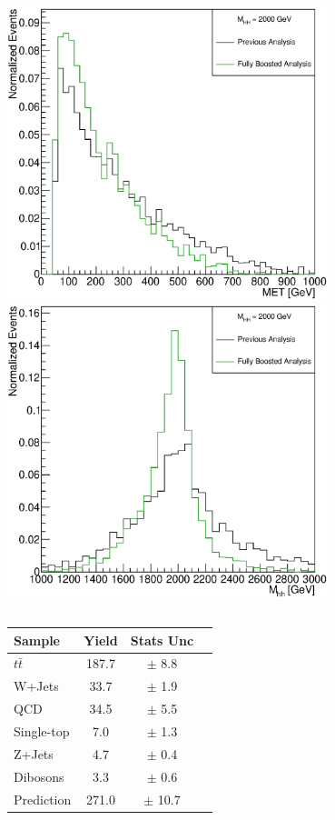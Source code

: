 \documentclass{beamer}
\newcommand*{\ttbar}{\ensuremath{t\bar{t}}\xspace}
\newcommand*{\header}[1]{\fontsize{16}{8}\selectfont \textbf{{\color{MyPurple}{#1}}}}
\begin{document}
\begin{frame}
\begin{columns}
\begin{column}{0.5\textwidth}
\begin{center}
\includegraphics[width=0.7\textwidth]{figures/WHad_plots_john_withcuts/muon/wlep_met_Xhh2000}\\
\includegraphics[width=0.7\textwidth]{figures/WHad_plots_john_withcuts/muon/hh_m_Xhh2000}
\end{center}
\end{column}
\end{columns}
\end{frame}

\begin{frame}
\begin{center}
\header{Fully Boosted SR}
\end{center}
\begin{table}
\begin{tabular}{l|c|c|c}
\hline
Sample        &  Yield   &  Stats Unc \\ 
\hline 
$\ttbar$    &  187.7  & $\pm$ 8.8    \\
W+Jets        &  33.7   & $\pm$ 1.9     \\
QCD           &  34.5   & $\pm$ 5.5     \\
Single-top    &  7.0   & $\pm$ 1.3     \\
Z+Jets        &  4.7    & $\pm$ 0.4        \\
Dibosons      &  3.3    & $\pm$ 0.6      \\
\hline
Prediction    &  271.0  & $\pm$ 10.7       \\
\hline
\end{tabular}
\end{table}
\end{frame}
\end{document}

